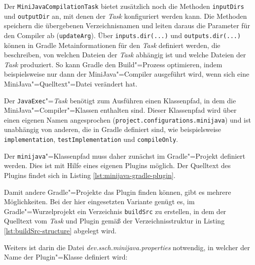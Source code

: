 

\pagebreak
Der \lstinline{MiniJavaCompilationTask} bietet zusätzlich noch die Methoden \lstinline{inputDirs} und \lstinline{outputDir} an, mit denen der \emph{Task} konfiguriert werden kann. Die Methoden speichern die übergebenen Verzeichnisnamen und leiten daraus die Parameter für den Compiler ab (\lstinline{updateArg}). Über \lstinline{inputs.dir(...)} und \lstinline{outputs.dir(...)} können in Gradle Metainformationen für den \emph{Task} definiert werden, die beschreiben, von welchen Dateien der \emph{Task} abhängig ist und welche Dateien der \emph{Task} produziert. So kann Gradle den Build"=Prozess optimieren, indem beispielsweise nur dann der MiniJava"=Compiler ausgeführt wird, wenn sich eine MiniJava"=Quelltext"=Datei verändert hat.

Der \lstinline{JavaExec}"=\emph{Task} benötigt zum Ausführen einen Klassenpfad, in dem die MiniJava"=Compiler"=Klassen enthalten sind. Dieser Klassenpfad wird über einen eigenen Namen angesprochen (\lstinline{project.configurations.minijava}) und ist unabhängig von anderen, die in Gradle definiert sind, wie beispielsweise \lstinline{implementation}, \lstinline{testImplementation} und \lstinline{compileOnly}.

Der \lstinline{minijava}"=Klassenpfad muss daher zunächst im Gradle"=Projekt definiert werden. Dies ist mit Hilfe eines eigenen Plugins möglich. Der Quelltext des Plugins findet sich in Listing \ref{lst:minijava-gradle-plugin}.



Damit andere Gradle"=Projekte das Plugin finden können, gibt es mehrere Möglichkeiten. Bei der hier eingesetzten Variante genügt es, im Gradle"=Wurzelprojekt ein Verzeichnis \lstinline{buildSrc} zu erstellen, in dem der Quelltext vom \emph{Task} und Plugin gemäß der Verzeichnisstruktur in Listing \ref{lst:buildSrc-structure} abgelegt wird.



Weiters ist darin die Datei \emph{dev.ssch.minijava.properties} notwendig, in welcher der Name der Plugin"=Klasse definiert wird:

